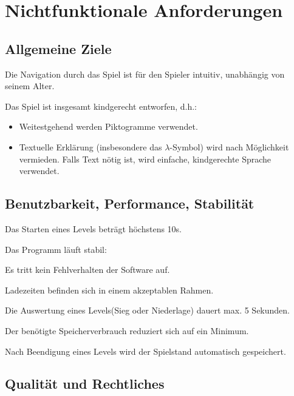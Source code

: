 \documentclass{scrartcl}
\begin{document}

\section{Nichtfunktionale Anforderungen}

\subsection{Allgemeine Ziele}

\begin{nflist}
    \item Die Navigation durch das Spiel ist für den Spieler intuitiv, unabhängig von seinem Alter.
    \item Das Spiel ist insgesamt kindgerecht entworfen, d.h.:
    \begin{itemize}
    \item Weitestgehend werden Piktogramme verwendet.
    \item Textuelle Erklärung (insbesondere das $\lambda$-Symbol) wird nach Möglichkeit vermieden. Falls Text nötig ist, wird einfache, kindgerechte Sprache verwendet.
    \end{itemize}
\end{nflist}

\subsection{Benutzbarkeit, Performance, Stabilität}
\begin{nflist}[resume]
	\item Das Starten eines Levels beträgt höchstens 10s. 
	\item Das Programm läuft stabil: 
	\begin{nflist}
		\item Es tritt kein Fehlverhalten der Software auf.
		\item Ladezeiten befinden sich in einem akzeptablen Rahmen. 
	\end{nflist}
	\item Die Auswertung eines Levels(Sieg oder Niederlage) dauert max. 5 Sekunden.
	\item Der benötigte Speicherverbrauch reduziert sich auf ein Minimum. 
	\item Nach Beendigung eines Levels wird der Spielstand automatisch gespeichert.
\end{nflist}

\subsection{Qualität und Rechtliches}
\end{document}
